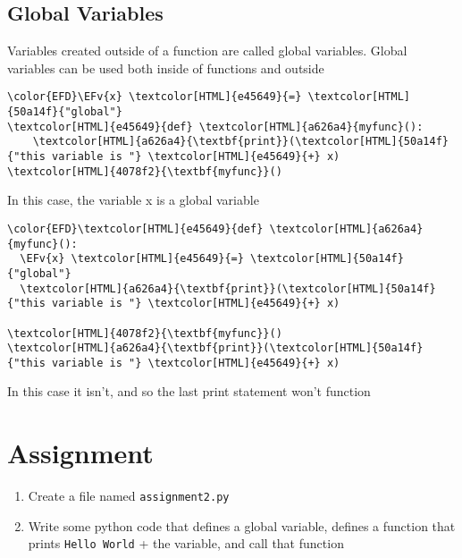 \documentclass{scrartcl}
\newcommand{\EFv}[1]{\textcolor{EFv}{#1}} %
\begin{document}
\subsection{Global Variables}
\label{sec:orgc42a379}
Variables created outside of a function are called global variables. Global
variables can be used both inside of functions and outside
\begin{Code}
\begin{Verbatim}[]
\color{EFD}\EFv{x} \textcolor[HTML]{e45649}{=} \textcolor[HTML]{50a14f}{"global"}
\textcolor[HTML]{e45649}{def} \textcolor[HTML]{a626a4}{myfunc}():
    \textcolor[HTML]{a626a4}{\textbf{print}}(\textcolor[HTML]{50a14f}{"this variable is "} \textcolor[HTML]{e45649}{+} x)
\textcolor[HTML]{4078f2}{\textbf{myfunc}}()
\end{Verbatim}
\end{Code}
In this case, the variable x is a global variable
\begin{Code}
\begin{Verbatim}[]
\color{EFD}\textcolor[HTML]{e45649}{def} \textcolor[HTML]{a626a4}{myfunc}():
  \EFv{x} \textcolor[HTML]{e45649}{=} \textcolor[HTML]{50a14f}{"global"}
  \textcolor[HTML]{a626a4}{\textbf{print}}(\textcolor[HTML]{50a14f}{"this variable is "} \textcolor[HTML]{e45649}{+} x)

\textcolor[HTML]{4078f2}{\textbf{myfunc}}()
\textcolor[HTML]{a626a4}{\textbf{print}}(\textcolor[HTML]{50a14f}{"this variable is "} \textcolor[HTML]{e45649}{+} x)
\end{Verbatim}
\end{Code}
In this case it isn't, and so the last print statement won't function

\section{Assignment}
\label{sec:orgdacfd43}
\begin{enumerate}
\item Create a file named \texttt{assignment2.py}
\item Write some python code that defines a global variable, defines a function
that prints \texttt{Hello World} + the variable, and call that function
\end{enumerate}
\end{document}

